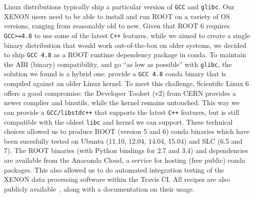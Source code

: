 \documentclass[a4paper]{jpconf}
\begin{document}
Linux distributions typically ship a particular version of \texttt{GCC} and \texttt{glibc}.
Our XENON users need to be able to install and run ROOT on a variety of OS versions, ranging from reasonably old to new.
Given that ROOT 6 requires \texttt{GCC>=4.8} to use some of the latest \texttt{C++} features, while we aimed to create a single binary distribution that would work 
out-of-the-box on older systems, we decided to ship \texttt{GCC 4.8} as a ROOT runtime dependency package in conda.
To maintain the ABI (binary) compatibility, and go ``as low as possible'' with \texttt{glibc}, the solution we found is a hybrid one: 
provide a \texttt{GCC 4.8} conda binary that is compiled against an older Linux kernel.
To meet this challenge, Scientific Linux 6 offers a good compromise: the Developer Toolset (v2) from CERN provides 
a newer complier and binutils, while the kernel remains untouched. This way we can provide a \texttt{GCC/libstdc++}
that supports the latest \texttt{C++} features, but is still compatible with the oldest \texttt{libc} and kernel we can support.
These technical choices allowed us to produce ROOT (version 5 and 6) conda binaries which have been sucesfully tested on Ubuntu (11.10, 12.04, 14.04, 15.04) and SLC (6.5 and 7).
The ROOT binaries (with Python bindings for 2.7 and 3.4) and dependencies are available from the Anaconda Cloud, a service for hosting (free public) conda packages.
This also allowed us to do automated integration testing of the XENON data processing software within the Travis CI.
All recipes are also publicly available~\cite{daniela_remenska_2016_47512}, along with a documentation on their usage.
\end{document}
